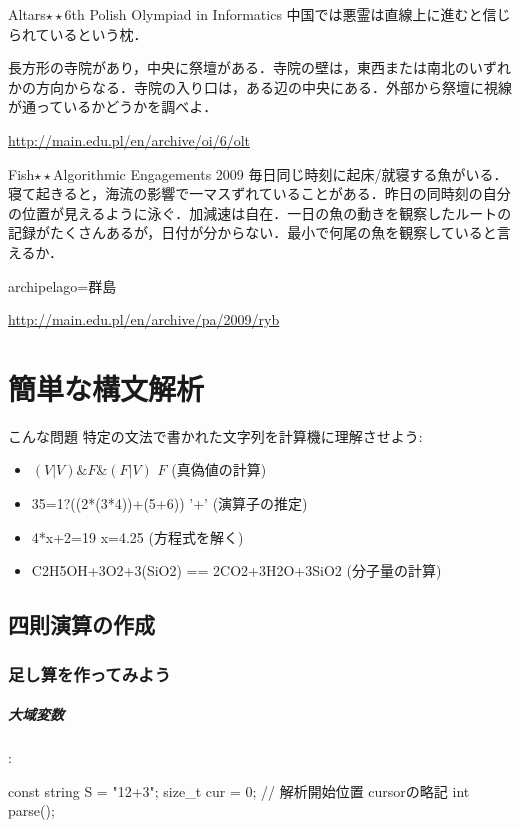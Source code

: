 \begin{pbox}{Altars$\star\star$}{6th Polish Olympiad in Informatics}
中国では悪霊は直線上に進むと信じられているという枕．

長方形の寺院があり，中央に祭壇がある．寺院の壁は，東西または南北のいずれかの方向からなる．寺院の入り口は，ある辺の中央にある．外部から祭壇に視線が通っているかどうかを調べよ．

\url{http://main.edu.pl/en/archive/oi/6/olt}  
\end{pbox}

\begin{pbox}{Fish$\star\star$}{Algorithmic Engagements 2009}
毎日同じ時刻に起床/就寝する魚がいる．寝て起きると，海流の影響で一マスずれていることがある．昨日の同時刻の自分の位置が見えるように泳ぐ．加減速は自在．一日の魚の動きを観察したルートの記録がたくさんあるが，日付が分からない．最小で何尾の魚を観察していると言えるか．

archipelago=群島

\url{http://main.edu.pl/en/archive/pa/2009/ryb}  
\end{pbox}
 \chapter{簡単な構文解析}\label{chapter:parsing}

\begin{itembox}[l]{こんな問題}
特定の文法で書かれた文字列を計算機に理解させよう:
  \begin{itemize}
\setlength{\itemsep}{0pt}
  \item $( V | V ) \& F \& ( F| V)$ \dingright $F$ (真偽値の計算)
  \item 35=1?((2*(3*4))+(5+6)) \dingright '+'  (演算子の推定)
  \item 4*x+2=19 \dingright x=4.25 (方程式を解く)
  \item C2H5OH+3O2+3(SiO2) == 2CO2+3H2O+3SiO2 (分子量の計算)
  \end{itemize}  
\end{itembox}

\section{四則演算の作成}

\subsection{足し算を作ってみよう}

\paragraph{大域変数}:
\begin{cbox}
const string S = "12+3";
size_t cur = 0; // 解析開始位置 cursorの略記
int parse();
\end{cbox}

